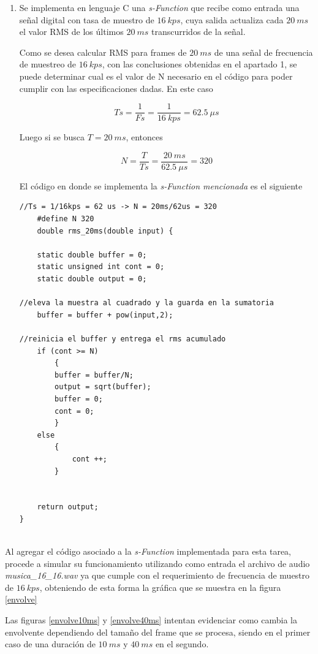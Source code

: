 

\begin{enumerate}
    \item  Se implementa en lenguaje C una \textit{s-Function} que recibe como entrada una señal digital con tasa de muestro de $16~kps$, cuya salida actualiza cada $20~ms$ el valor RMS de los últimos $20~ms$ transcurridos de la señal.
    
    
    Como se desea calcular RMS para frames de $20~ms$ de una señal de frecuencia de muestreo de $16~kps$, con las conclusiones obtenidas en el apartado 1, se puede determinar cual es el valor de N necesario en el código para poder cumplir con las especificaciones dadas. En este caso
    
    $$Ts = \frac{1}{Fs} = \frac{1}{16~kps} = 62.5~\mu s$$
    
    Luego si se busca  $T = 20~ms$, entonces
    
    $$ N = \frac{T}{Ts}= \frac{20 ~ms}{62.5~\mu s}= 320$$
    
    El código  en donde se implementa la \textit{s-Function mencionada} es el siguiente
    
    
    
    \begin{lstlisting}
//Ts = 1/16kps = 62 us -> N = 20ms/62us = 320
    #define N 320 
    double rms_20ms(double input) {

	static double buffer = 0;
	static unsigned int cont = 0;
	static double output = 0;
    
//eleva la muestra al cuadrado y la guarda en la sumatoria
	buffer = buffer + pow(input,2);

//reinicia el buffer y entrega el rms acumulado 
	if (cont >= N)   
	    {
		buffer = buffer/N;  
		output = sqrt(buffer);
		buffer = 0;
		cont = 0;
    	}
	else
		{
			cont ++;
		}


	return output;
}


    \end{lstlisting}
\end{enumerate}


Al agregar el código asociado a la \textit{s-Function} implementada para esta tarea, procede a simular su funcionamiento utilizando como entrada el archivo de audio \textit{musica\_16\_16.wav} ya que cumple con el requerimiento de frecuencia de muestro de $16~kps$, obteniendo de esta forma la gráfica que se muestra en la figura \ref{envolve}


Las figuras \ref{envolve10ms} y \ref{envolve40ms} intentan evidenciar como cambia la envolvente dependiendo del tamaño del frame que se procesa, siendo en el primer caso de una duración de $10~ms$ y $40~ms$ en  el segundo.

